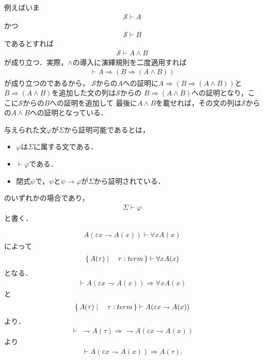 	例えばいま
	\begin{align}
		\mathscr{S} \vdash A
	\end{align}
	かつ
	\begin{align}
		\mathscr{S} \vdash B
	\end{align}
	であるとすれば
	\begin{align}
		\mathscr{S} \vdash A \wedge B
	\end{align}
	が成り立つ．実際，$\wedge$の導入に演繹規則を二度適用すれば
	\begin{align}
		\vdash A \Longrightarrow (B \Longrightarrow (A \wedge B))
	\end{align}
	が成り立つのであるから，
	$\mathscr{S}$からの$A$への証明に$A \Longrightarrow (B \Longrightarrow (A \wedge B))$と
	$B \Longrightarrow (A \wedge B)$を追加した文の列は$\mathscr{S}$からの
	$B \Longrightarrow (A \wedge B)$への証明となり，ここに$\mathscr{S}$からの$B$への証明を追加して
	最後に$A \wedge B$を載せれば，その文の列は$\mathscr{S}$からの$A \wedge B$への証明となっている．
	
	与えられた文$\varphi$が$\Sigma$から証明可能であるとは，
	\begin{itemize}
		\item $\varphi$は$\Sigma$に属する文である．
		\item $\vdash \varphi$である．
		\item 閉式$\psi$で，$\psi$と$\psi \rightarrow \varphi$が$\Sigma$から証明されている．
	\end{itemize}
	
	のいずれかの場合であり，
	\begin{align}
		\Sigma \vdash \varphi
	\end{align}
	と書く．
	
	\begin{align}
		A(\varepsilon x \rightharpoondown A(x)) \vdash \forall x A(x)
	\end{align}
	によって
	\begin{align}
		\left\{\, A(\tau) \mid \quad \tau:term\, \right\} \vdash \forall x A(x)
	\end{align}
	となる．
	\begin{align}
		\vdash A(\varepsilon x \rightharpoondown A(x)) \Longrightarrow \forall x A(x)
	\end{align}
	と
	\begin{align}
		\left\{\, A(\tau) \mid \quad \tau:term\, \right\} \vdash A(\varepsilon x \rightharpoondown A(x))
	\end{align}
	より．
	\begin{align}
		\vdash\ \rightharpoondown A(\tau) \Longrightarrow \rightharpoondown A(\varepsilon x \rightharpoondown A(x))
	\end{align}
	より
	\begin{align}
		\vdash A(\varepsilon x \rightharpoondown A(x)) \Longrightarrow A(\tau).
	\end{align}